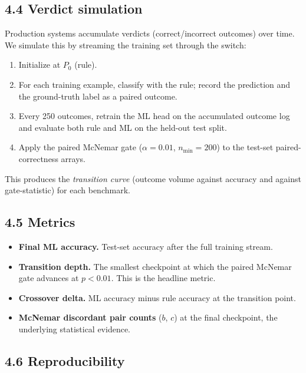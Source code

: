 \subsection{4.4 Verdict simulation}\label{verdict-simulation}

Production systems accumulate verdicts (correct/incorrect outcomes) over
time. We simulate this by streaming the training set through the switch:

\begin{enumerate}
\def\labelenumi{\arabic{enumi}.}
\tightlist
\item
  Initialize at \(P_0\) (rule).
\item
  For each training example, classify with the rule; record the
  prediction and the ground-truth label as a paired outcome.
\item
  Every 250 outcomes, retrain the ML head on the accumulated outcome log
  and evaluate both rule and ML on the held-out test split.
\item
  Apply the paired McNemar gate (\(\alpha = 0.01\), \(n_{\min} = 200\))
  to the test-set paired-correctness arrays.
\end{enumerate}

This produces the \emph{transition curve} (outcome volume against
accuracy and against gate-statistic) for each benchmark.

\subsection{4.5 Metrics}\label{metrics}

\begin{itemize}
\tightlist
\item
  \textbf{Final ML accuracy.} Test-set accuracy after the full training
  stream.
\item
  \textbf{Transition depth.} The smallest checkpoint at which the paired
  McNemar gate advances at \(p < 0.01\). This is the headline metric.
\item
  \textbf{Crossover delta.} ML accuracy minus rule accuracy at the
  transition point.
\item
  \textbf{McNemar discordant pair counts} (\(b\), \(c\)) at the final
  checkpoint, the underlying statistical evidence.
\end{itemize}

\subsection{4.6 Reproducibility}\label{reproducibility}

